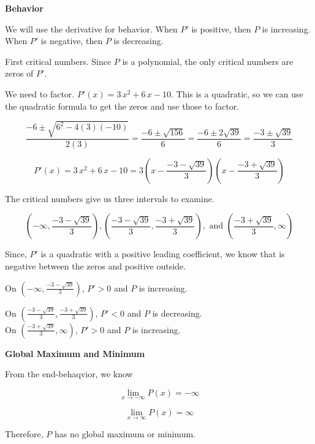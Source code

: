\documentclass{ximera}
\begin{document}
\textbf{Behavior}

We will use the derivative for behavior. When $P'$ is positive, then $P$ is increasing.  When $P'$ is negative, then $P$ is decreasing.  


First critical numbers.  Since $P$ is a polynomial, the only critical numbers are zeros of $P'$.  


We need to factor. $P'(x) = 3 \, x^2 + 6 \, x - 10$.  This is a quadratic, so we can use the quadratic formula to get  the zeros and use those to factor. 


\[
\frac{-6 \pm \sqrt{6^2 - 4 (3)(-10)}}{2(3)} = \frac{-6 \pm \sqrt{156}}{6} = \frac{-6 \pm 2\sqrt{39}}{6} = \frac{-3 \pm \sqrt{39}}{3}
\]




\[
P'(x) = 3 \, x^2 + 6 \, x - 10 = 3 \left( x - \frac{-3 - \sqrt{39}}{3} \right) \left( x - \frac{-3 + \sqrt{39}}{3}  \right)
\]



The critical numbers give us three intervals to examine.

\[
\left( -\infty, \frac{-3 - \sqrt{39}}{3} \right), \left( \frac{-3 - \sqrt{39}}{3}, \frac{-3 + \sqrt{39}}{3} \right), \text{ and } \left( \frac{-3 + \sqrt{39}}{3}, \infty \right)
\]


Since, $P'$ is a quadratic with a positive leading coefficient, we know that is negative between the zeros and positive outside. 



On $\left( -\infty, \frac{-3 - \sqrt{39}}{3} \right)$, $P' > 0$ and $P$ is increasing. 


On $\left( \frac{-3 - \sqrt{39}}{3}, \frac{-3 + \sqrt{39}}{3} \right)$, $P' < 0$ and $P$ is decreasing. \\


On $\left( \frac{-3 + \sqrt{39}}{3}, \infty \right)$, $P' > 0$ and $P$ is increasing. 





\textbf{Global Maximum and Minimum}


From the end-behaqvior, we know

\[
\lim\limits_{x \to -\infty} P(x) = -\infty 
\]




\[
\lim\limits_{x \to \infty} P(x) = \infty 
\]



Therefore, $P$ has no global maximum or minimum. 
\end{document}
